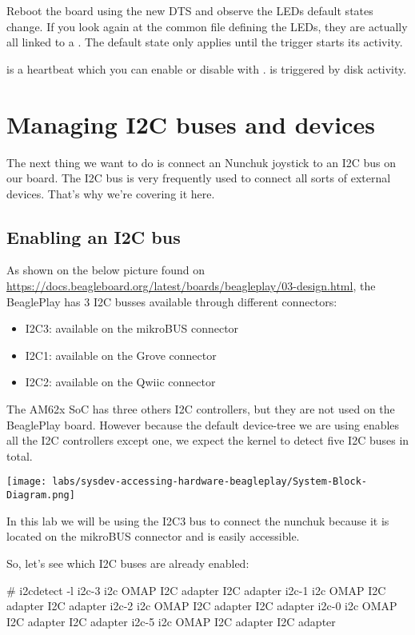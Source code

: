 Reboot the board using the new DTS and observe the LEDs default states change.
If you look again at the common file defining the LEDs, they are actually all
linked to a . The default state only applies until
the trigger starts its activity.

 is a heartbeat which you can enable or disable with
.  is triggered by disk
activity.

\section{Managing I2C buses and devices}

The next thing we want to do is connect an Nunchuk joystick
to an I2C bus on our board. The I2C bus is very frequently used
to connect all sorts of external devices. That's why we're covering
it here.

\subsection{Enabling an I2C bus}

As shown on the below picture found on
\url{https://docs.beagleboard.org/latest/boards/beagleplay/03-design.html}, the
BeaglePlay has 3 I2C busses available through different connectors:

\begin{itemize}
\item I2C3: available on the mikroBUS connector
\item I2C1: available on the Grove connector
\item I2C2: available on the Qwiic connector
\end{itemize}

The AM62x SoC has three others I2C controllers, but they are not used on the
BeaglePlay board. However because the default device-tree we are using enables
all the I2C controllers except one, we expect the kernel to detect five I2C
buses in total.

\texttt{[image: labs/sysdev-accessing-hardware-beagleplay/System-Block-Diagram.png]}

In this lab we will be using the I2C3 bus to connect the nunchuk because it is
located on the mikroBUS connector and is easily accessible.

So, let's see which I2C buses are already enabled:

\begin{bashinput}
# i2cdetect -l
i2c-3 i2c OMAP I2C adapter I2C adapter
i2c-1 i2c OMAP I2C adapter I2C adapter
i2c-2 i2c OMAP I2C adapter I2C adapter
i2c-0 i2c OMAP I2C adapter I2C adapter
i2c-5 i2c OMAP I2C adapter I2C adapter
\end{bashinput}

